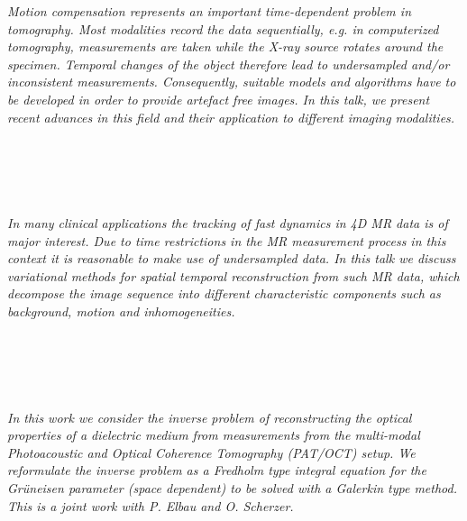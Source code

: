 \begin{multicols}{2}
\\ 
        \\
        \\\\
\\
      \textit{Motion compensation represents an important time-dependent problem in tomography. Most modalities record the data sequentially, e.g. in computerized tomography, measurements are taken while the X-ray source rotates around the specimen. Temporal changes of the object therefore lead to undersampled and/or inconsistent measurements. Consequently, suitable models and algorithms have to be developed in order to provide artefact free images. In this talk, we present recent advances in this field and their application to different imaging modalities.}\\
\\ 
        \\
        \\\\
\\
      \textit{In many clinical applications the tracking of fast dynamics in 4D MR data is of major interest. Due to time restrictions in the MR measurement process in this context it is reasonable to make use of undersampled data. In this talk we discuss variational methods for spatial temporal reconstruction from such MR data, which decompose the image sequence into different characteristic components such as background, motion and inhomogeneities. }\\
\\ 
        \\
        \\\\
\\
      \textit{In this work we consider the inverse problem of reconstructing the optical properties of a dielectric medium from measurements from the multi-modal Photoacoustic and Optical Coherence Tomography (PAT/OCT) setup.  We reformulate the inverse problem as a Fredholm type integral equation for the Grüneisen parameter (space dependent) to be solved with a Galerkin type method. 
This is a joint work with P. Elbau and O. Scherzer.  }\\
\\ 
        \\

\end{multicols}
